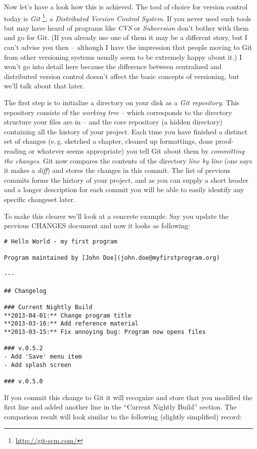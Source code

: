 \documentclass[../../LilyPond-Tutorials]{subfiles}
\begin{document}
\medskip
Now let's have a look how this is achieved.
The tool of choice for version control today is \emph{Git}%
\footnote{\url{http://git-scm.com/}},
a \emph{Distributed Version Control System}.
If you never used such tools but may have heard of programs like \emph{CVS} or \emph{Subversion} don't bother with them and go for Git.
(If you already use one of them it may be a different story, but I can't advise you then -- although I have the impression that people moving to Git from other versioning systems usually seem to be extremely happy about it.)
I won't go into detail here because the difference between centralized and distributed version control doesn't affect the basic concepts of versioning, but we'll talk about that later.

The first step is to initialize a directory on your disk as a \emph{Git repository}.
This repository consists of the \emph{working tree} -- which corresponds to the directory structure your files are in -- and the core repository (a hidden directory) containing all the history of your project.
Each time you have finished a distinct set of changes (e.\,g. sketched a chapter, cleaned up formattings, done proof-reading or whatever seems appropriate) you tell Git about them by \emph{committing the changes}.
Git now compares the contents of the directory \emph{line by line} (one says it makes a \emph{diff}) and stores the changes in this commit.
The list of previous commits forms the history of your project, and as you can supply a short header and a longer description for each commit you will be able to easily identify any specific changeset later.

To make this clearer we'll look at a concrete example.
Say you update the previous CHANGES document and now it looks as following:
\begin{lstlisting}[frame=single]
# Hello World - my first program

Program maintained by [John Doe](john.doe@myfirstprogram.org)

---

## Changelog

### Current Nightly Build
**2013-04-01:** Change program title  
**2013-03-16:** Add reference material  
**2013-03-15:** Fix annoying bug: Program now opens files

### v.0.5.2
- Add 'Save' menu item
- Add splash screen

### v.0.5.0
\end{lstlisting}

If you commit this change to Git it will recognize and store that you modified the first line and added another line in the “Current Nightly Build” section.
The comparison result will look similar to the following (slightly simplified) record:
\end{document}
